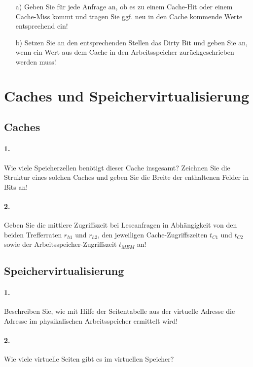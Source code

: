 \documentclass[paper=a4, fontsize=11pt]{scrartcl}
\numberwithin{equation}{section}
\numberwithin{figure}{section}
\numberwithin{table}{section}
\begin{document}
\begin{itemize}
\item[a)] Geben Sie für jede Anfrage an, ob es zu einem Cache-Hit oder einem Cache-Miss kommt und tragen Sie ggf. neu in den Cache kommende Werte entsprechend ein!
\item[b)] Setzen Sie an den entsprechenden Stellen das Dirty Bit und geben Sie an, wenn ein Wert aus dem Cache in den Arbeitsspeicher zurückgeschrieben werden muss!
\end{itemize}

\section{Caches und Speichervirtualisierung}
\subsection{Caches}

\paragraph{1.}
Wie viele Speicherzellen benötigt dieser Cache insgesamt? Zeichnen Sie die Struktur eines solchen Caches und geben Sie die Breite der enthaltenen Felder in Bits an!

\paragraph{2.}
Geben Sie die mittlere Zugriffszeit bei Leseanfragen in Abhängigkeit von den beiden Trefferraten $r_{h1}$ und $r_{h2}$, den jeweiligen Cache-Zugriffszeiten $t_{C1}$ und $t_{C2}$ sowie der Arbeitsspeicher-Zugriffszeit $t_{MEM}$ an!

\subsection{Speichervirtualisierung}

\paragraph{1.}
Beschreiben Sie, wie mit Hilfe der Seitentabelle aus der virtuelle Adresse die Adresse im physikalischen Arbeitsspeicher ermittelt wird!

\paragraph{2.}
Wie viele virtuelle Seiten gibt es im virtuellen Speicher?
\end{document}
